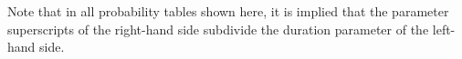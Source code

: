 \documentclass{article}
\begin{document}
Note that in all probability tables shown here, it is implied that the parameter superscripts of the right-hand side subdivide the duration parameter of the left-hand side. %


\end{document}
